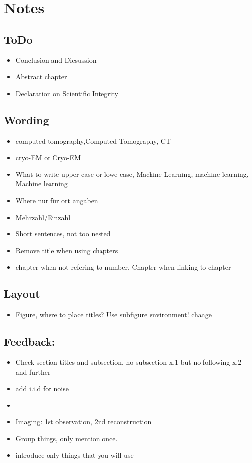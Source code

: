 \chapter{Notes}

\section{ToDo}
\begin{itemize}
    \item Conclusion and Dicsussion
    \item Abstract chapter
    \item Declaration on Scientific Integrity
\end{itemize}


\section{Wording}
\begin{itemize}
    \item computed tomography,Computed Tomography, CT
    \item cryo-EM or Cryo-EM
    \item What to write upper case or lowe case, Machine Learning, machine learning, Machine learning
    \item Where nur für ort angaben
    \item Mehrzahl/Einzahl
    \item Short sentences, not too nested
    \item Remove title when using chapters
    \item chapter when not refering to number, Chapter when linking to chapter
\end{itemize}

\section*{Layout}
\begin{itemize}
    \item Figure, where to place titles? Use subfigure environment! change 
\end{itemize}

\section{Feedback:}
\begin{itemize}
    \item Check section titles and subsection, no subsection x.1 but no following x.2 and further
    \item add i.i.d for noise
    \item \item Imaging: 1st observation, 2nd reconstruction
    \item Group things, only mention once.
    \item introduce only things that you will use
\end{itemize}


\clearpage
